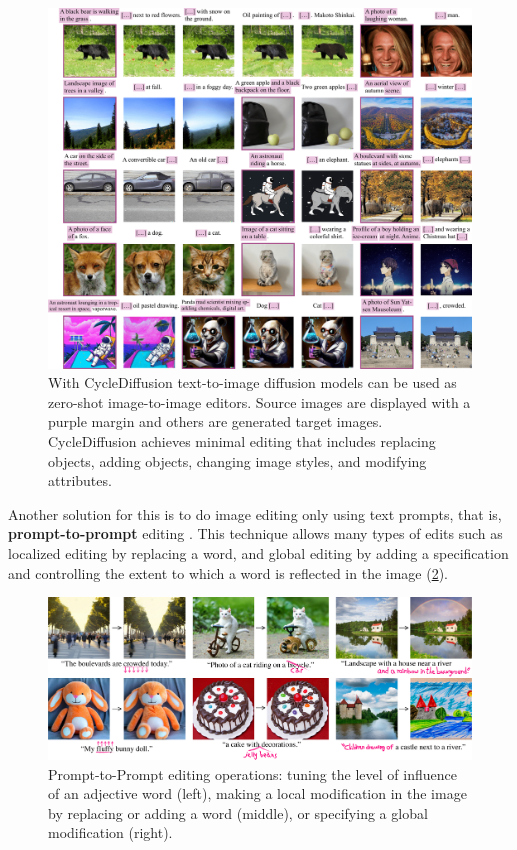 \begin{figure}[ht]
    \centering
    \includegraphics[width=\linewidth]{images/future/cycle-diffusion.png}
    \caption{With CycleDiffusion text-to-image diffusion models can be used as zero-shot image-to-image editors. Source images are displayed with a purple margin and others are generated target images. CycleDiffusion achieves minimal editing that includes replacing objects, adding objects, changing image styles, and modifying attributes.}
    \label{fig:cycle-diffusion}
\end{figure}

Another solution for this is to do image editing only using text prompts, that is, \textbf{prompt-to-prompt} editing \cite{hertz2022prompt}. This technique allows many types of edits such as localized editing by replacing a word, and global editing by adding a specification and controlling the extent to which a word is reflected in the image (\cref{fig:prompt-to-prompt}).

\begin{figure}[ht]
    \centering
    \includegraphics[width=\linewidth]{images/future/prompt-to-prompt.png}
    \caption{Prompt-to-Prompt editing operations: tuning the level of influence of an adjective word (left), making a local modification in the image by replacing or adding a word (middle), or specifying a global modification (right).}
    \label{fig:prompt-to-prompt}
\end{figure}

